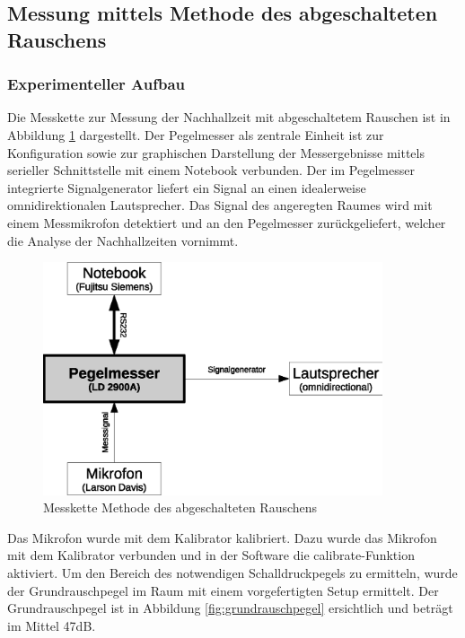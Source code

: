 \documentclass[11pt]{report}
\begin{document}
\subsection{Messung mittels Methode des abgeschalteten Rauschens}

\subsubsection{Experimenteller Aufbau}
Die Messkette zur Messung der Nachhallzeit mit abgeschaltetem Rauschen ist in Abbildung \ref{fig:rauschaufbau} dargestellt. Der Pegelmesser als zentrale Einheit ist zur Konfiguration sowie zur graphischen Darstellung der Messergebnisse mittels serieller Schnittstelle mit einem Notebook verbunden. Der im Pegelmesser integrierte Signalgenerator liefert ein Signal an einen idealerweise omnidirektionalen Lautsprecher. Das Signal des angeregten Raumes wird mit einem Messmikrofon detektiert und an den Pegelmesser zurückgeliefert, welcher die Analyse der Nachhallzeiten vornimmt.
\begin{figure}[htbp]
\begin{center}
\includegraphics[width=10cm,keepaspectratio=true]{rauschaufbau}
\caption{Messkette Methode des abgeschalteten Rauschens}
\label{fig:rauschaufbau}
\end{center}
\end{figure}
Das Mikrofon wurde mit dem Kalibrator kalibriert. Dazu wurde das Mikrofon mit dem Kalibrator verbunden und in der Software die calibrate-Funktion aktiviert. Um den Bereich des notwendigen Schalldruckpegels zu ermitteln, wurde der Grundrauschpegel im Raum mit einem vorgefertigten Setup ermittelt. Der Grundrauschpegel ist in Abbildung \ref{fig:grundrauschpegel} ersichtlich und beträgt im Mittel 47dB. 
\end{document}
